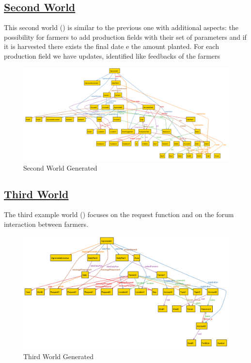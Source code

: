 	\FloatBarrier
	\newpage
	
	\subsection[Second World]{\hyperlink{toc}{Second World}}
	This second world () is similar to the previous one with additional aspects: the possibility for farmers to add production fields with their set of parameters and if it is harvested there exists the final date e the amount planted. For each production field we have updates, identified like feedbacks of the farmers
	
	\begin{figure}[hbtp]
		\centering
		\includegraphics[scale=0.5, angle=90]{Files/alloy/world2.png}
		\caption{\label{fig:secondWorld}Second World Generated}
	\end{figure}
	
	\FloatBarrier
	\newpage
	\subsection[Third World]{\hyperlink{toc}{Third World}}
	The third example world () focuses on the request function and on the forum interaction between farmers.
	
	\begin{figure}[h!]
		\centering
		\includegraphics[scale=0.7, angle=90]{Files/alloy/world3.png}
		\caption{\label{fig:thirdWorld}Third World Generated}
	\end{figure}

